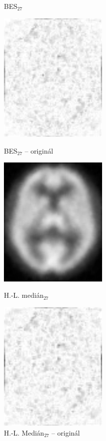 \begin{figure}[htp]
\begin{minipage}[l]{0.5\textwidth}
            \caption{BES$_{27}$}
        \end{minipage}
        \begin{minipage}[r]{0.5\textwidth}
            \center
            \includegraphics[width = 150pt]{src/8Appendix/final/10-100besD.png}
            \caption{BES$_{27}$ -- originál}
        \end{minipage}
        \begin{minipage}[l]{0.5\textwidth}
            \center
            \includegraphics[width = 150pt]{src/8Appendix/final/10-100wmed.png}
            \caption{H.-L. medián$_{27}$}
        \end{minipage}
        \begin{minipage}[r]{0.5\textwidth}
            \center
            \includegraphics[width = 150pt]{src/8Appendix/final/10-100wmedD.png}
            \caption{H.-L. Medián$_{27}$ -- originál}
        \end{minipage}
    \end{figure}
